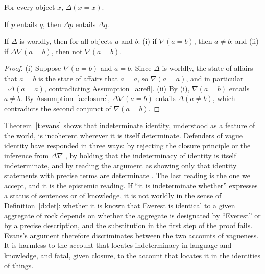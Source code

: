 \documentclass{situationist-preprint}
\begin{document}
\begin{assumption}\label{a:refl}
For every object $x$, $\Delta(x = x)$.
\end{assumption}

\begin{assumption}\label{a:closure}
If $p$ entails $q$, then $\Delta p$ entails $\Delta q$.
\end{assumption}

\begin{theorem}[Evans]\label{t:evans}
If $\Delta$ is worldly, then for all objects $a$ and $b$: (i) if $\nabla(a = b)$, then $a \neq b$; and (ii) if $\Delta \nabla (a = b)$, then not $\nabla (a = b)$.
\end{theorem}

\begin{proof}
(i) Suppose $\nabla(a = b)$ and $a = b$. Since $\Delta$ is worldly, the state of affairs that $a = b$ is the state of affairs that $a = a$, so $\nabla(a = a)$, and in particular $\neg\Delta(a = a)$, contradicting Assumption~\ref{a:refl}. (ii) By (i), $\nabla(a = b)$ entails $a \neq b$. By Assumption~\ref{a:closure}, $\Delta\nabla(a = b)$ entails $\Delta(a \neq b)$, which contradicts the second conjunct of $\nabla(a = b)$.
\end{proof}

Theorem~\ref{t:evans} shows that indeterminate identity, understood as a feature of the world, is incoherent wherever it is itself determinate. Defenders of vague identity have responded in three ways: by rejecting the closure principle or the inference from $\Delta\nabla$ \citep{Parsons2000}, by holding that the indeterminacy of identity is itself indeterminate, and by reading the argument as showing only that identity statements with precise terms are determinate \citep{Lewis1988}. The last reading is the one we accept, and it is the epistemic reading. If \enquote{it is indeterminate whether} expresses a status of sentences or of knowledge, it is not worldly in the sense of Definition~\ref{d:det}: whether it is known that Everest is identical to a given aggregate of rock depends on whether the aggregate is designated by \enquote{Everest} or by a precise description, and the substitution in the first step of the proof fails. Evans's argument therefore discriminates between the two accounts of vagueness. It is harmless to the account that locates indeterminacy in language and knowledge, and fatal, given closure, to the account that locates it in the identities of things.
\end{document}
